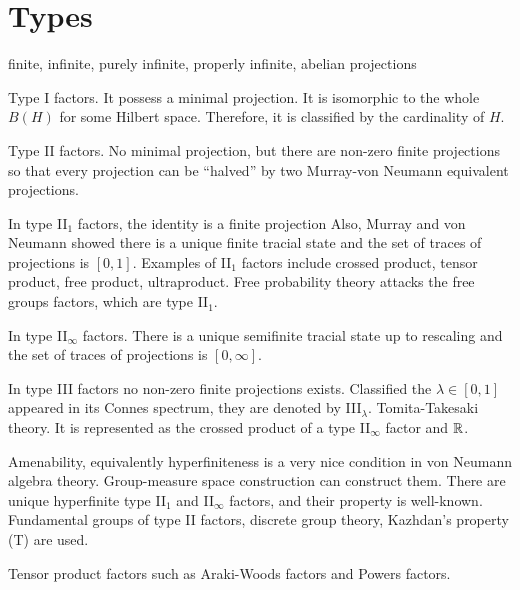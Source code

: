 \documentclass{../../large}
\begin{document}
\begin{prb}
\end{prb}

\begin{prb}
\end{prb}


\section{Types}

finite, infinite, purely infinite, properly infinite, abelian projections




\bigskip
Type I factors.
It possess a minimal projection.
It is isomorphic to the whole $B(H)$ for some Hilbert space.
Therefore, it is classified by the cardinality of $H$.

Type II factors.
No minimal projection, but there are non-zero finite projections so that every projection can be ``halved'' by two Murray-von Neumann equivalent projections.

In type II$_1$ factors, the identity is a finite projection
Also, Murray and von Neumann showed there is a unique finite tracial state and the set of traces of projections is $[0,1]$.
Examples of II$_1$ factors include crossed product, tensor product, free product, ultraproduct.
Free probability theory attacks the free groups factors, which are type II$_1$.

In type II$_\infty$ factors.
There is a unique semifinite tracial state up to rescaling and the set of traces of projections is $[0,\infty]$.

In type III factors no non-zero finite projections exists.
Classified the $\lambda\in[0,1]$ appeared in its Connes spectrum, they are denoted by III$_\lambda$.
Tomita-Takesaki theory.
It is represented as the crossed product of a type II$_\infty$ factor and $\mathbb{R}$.

Amenability, equivalently hyperfiniteness is a very nice condition in von Neumann algebra theory.
Group-measure space construction can construct them.
There are unique hyperfinite type II$_1$ and II$_\infty$ factors, and their property is well-known.
Fundamental groups of type II factors, discrete group theory, Kazhdan's property (T) are used.

Tensor product factors such as Araki-Woods factors and Powers factors.
\end{document}
